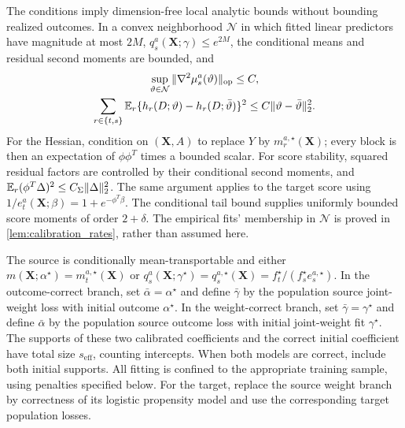\documentclass[12pt]{article}
\begin{document}
The conditions imply dimension-free local analytic bounds without bounding realized outcomes. In a convex neighborhood $\mathcal N$ in which fitted linear predictors have magnitude at most $2M$, $q_{s}^a(\boldsymbol X;\gamma)\le e^{2M}$, the conditional means and residual second moments are bounded, and
\begin{equation}\label{eq:local_score_bounds}
\begin{gathered}
\sup_{\vartheta\in\mathcal N}\|\nabla^2\mu_s^a(\vartheta)\|_{\mathrm{op}}\le C,
\\
\sum_{r\in\{t,s\}}\mathbb{E}_r\{h_r(D;\vartheta)-h_r(D;\bar\vartheta)\}^2
\le C\|\vartheta-\bar\vartheta\|_2^2.
\end{gathered}
\end{equation}
For the Hessian, condition on $(\boldsymbol X,A)$ to replace $Y$ by $m_r^{a,\star}(\boldsymbol X)$; every block is then an expectation of $\phi\phi^T$ times a bounded scalar. For score stability, squared residual factors are controlled by their conditional second moments, and $\mathbb{E}_r(\phi^T\Delta)^2\le C_\Sigma\|\Delta\|_2^2$. The same argument applies to the target score using $1/e_t^a(\boldsymbol X;\beta)=1+e^{-\phi^T\beta}$. The conditional tail bound supplies uniformly bounded score moments of order $2+\delta$. The empirical fits' membership in $\mathcal N$ is proved in \cref{lem:calibration_rates}, rather than assumed here.

\begin{assumption}\label{asmp:pairwise_nuisance}
The source is conditionally mean-transportable and either $m(\boldsymbol X;\alpha^\star)=m_t^{a,\star}(\boldsymbol X)$ or $q_{s}^a(\boldsymbol X;\gamma^\star)=q_s^{a,\star}(\boldsymbol X)=f_t^\star/(f_s^\star e_s^{a,\star})$. In the outcome-correct branch, set $\bar\alpha=\alpha^\star$ and define $\bar\gamma$ by the population source joint-weight loss with initial outcome $\alpha^\star$. In the weight-correct branch, set $\bar\gamma=\gamma^\star$ and define $\bar\alpha$ by the population source outcome loss with initial joint-weight fit $\gamma^\star$. The supports of these two calibrated coefficients and the correct initial coefficient have total size $s_{\mathrm{eff}}$, counting intercepts. When both models are correct, include both initial supports. All fitting is confined to the appropriate training sample, using penalties specified below. For the target, replace the source weight branch by correctness of its logistic propensity model and use the corresponding target population losses.
\end{assumption}
\end{document}
